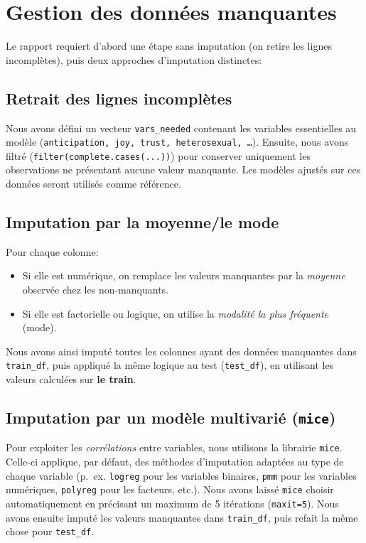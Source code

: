 \documentclass[11pt]{article}
\begin{document}
	\section{Gestion des données manquantes}
	Le rapport requiert d'abord une étape sans imputation (on retire les lignes incomplètes), puis deux approches d'imputation distinctes:
	
	\subsection{Retrait des lignes incomplètes}
	Nous avons défini un vecteur \texttt{vars\_needed} contenant les variables essentielles au modèle (\texttt{anticipation, joy, trust, heterosexual, \dots}). Ensuite, nous avons filtré (\texttt{filter(complete.cases(...))}) pour conserver uniquement les observations ne présentant aucune valeur manquante. Les modèles ajustés sur ces données seront utilisés comme référence.
	
	\subsection{Imputation par la moyenne/le mode}
	Pour chaque colonne:
	\begin{itemize}
		\item Si elle est numérique, on remplace les valeurs manquantes par la \emph{moyenne} observée chez les non-manquants.
		\item Si elle est factorielle ou logique, on utilise la \emph{modalité la plus fréquente} (mode).
	\end{itemize}
	Nous avons ainsi imputé toutes les colonnes ayant des données manquantes dans \texttt{train\_df}, puis appliqué la même logique au test (\texttt{test\_df}), en utilisant les valeurs calculées sur \textbf{le train}.
	
	\subsection{Imputation par un modèle multivarié (\texttt{mice})}
	Pour exploiter les \emph{corrélations} entre variables, nous utilisons la librairie \texttt{mice}. Celle-ci applique, par défaut, des méthodes d'imputation adaptées au type de chaque variable (p.~ex. \texttt{logreg} pour les variables binaires, \texttt{pmm} pour les variables numériques, \texttt{polyreg} pour les facteurs, etc.). Nous avons laissé \texttt{mice} choisir automatiquement en précisant un maximum de 5 itérations (\texttt{maxit=5}). Nous avons ensuite imputé les valeurs manquantes dans \texttt{train\_df}, puis refait la même chose pour \texttt{test\_df}.
	
\end{document}
